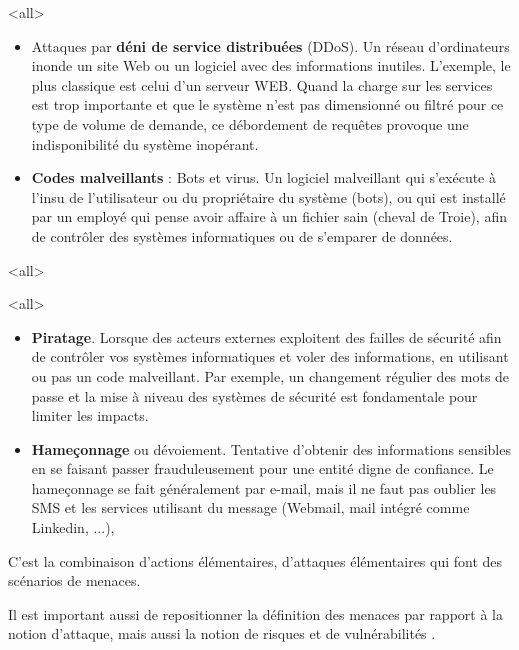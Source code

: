 \mode<all>{
{
\begin{itemize}
\item Attaques par \textbf{déni de service distribuées} (DDoS).  Un réseau d’ordinateurs inonde un site Web ou un logiciel avec des informations inutiles. L'exemple, le plus classique est celui d'un serveur WEB. Quand la charge sur les services est trop importante et que le système n'est pas dimensionné ou filtré pour ce type de volume de demande, ce débordement de requêtes provoque une indisponibilité du système inopérant. 
\item \textbf{Codes malveillants} : Bots et virus. Un logiciel malveillant qui s’exécute à l'insu de l'utilisateur ou du propriétaire du système (bots), ou qui est installé par un employé qui pense avoir affaire à un fichier sain (cheval de Troie), afin de contrôler des systèmes informatiques ou de s’emparer de données.
 \end{itemize}
}}

\mode<all>{}

\mode<all>{
{
\begin{itemize}
\item \textbf{Piratage}. Lorsque des acteurs externes exploitent des failles de sécurité afin de contrôler vos systèmes informatiques et voler des informations, en utilisant ou pas un code malveillant. Par exemple, un changement régulier des mots de passe et la mise à niveau des systèmes de sécurité est fondamentale pour limiter les impacts.
\item \textbf{Hameçonnage} ou dévoiement. Tentative d’obtenir des informations sensibles en se faisant passer frauduleusement pour une entité digne de confiance. Le hameçonnage se fait généralement par e-mail, mais il ne faut pas oublier les SMS et les services utilisant du message (Webmail, mail intégré comme Linkedin, ...), 
\end{itemize}
}}%


C'est la combinaison d'actions élémentaires, d'attaques élémentaires qui font des scénarios de menaces. 

Il est important aussi de repositionner la définition des menaces par rapport à la notion d'attaque, mais aussi la notion de risques et de vulnérabilités .

